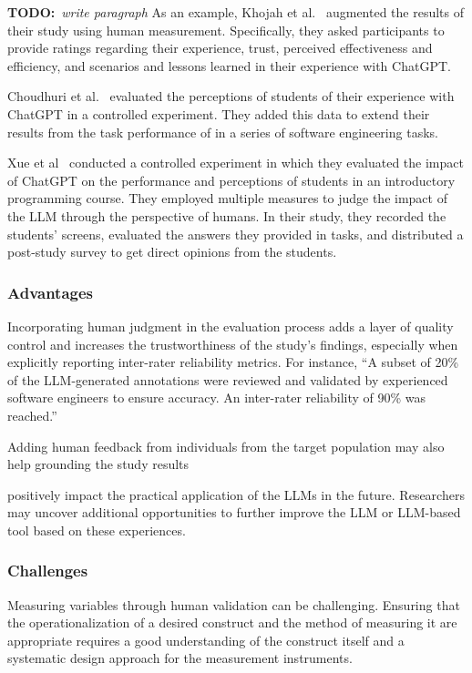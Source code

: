 \documentclass[11pt]{article}
\newcommand{\todo}[1]{{\textbf{TODO:}\ \textit{#1}}} %
\begin{document}
\todo{write paragraph}
As an example, Khojah et al.~\cite{DBLP:journals/pacmse/KhojahM0N24} augmented the results of their study using human measurement.
Specifically, they asked participants to provide ratings regarding their experience, trust, perceived effectiveness and efficiency, and scenarios and lessons learned in their experience with ChatGPT.

Choudhuri et al.~\cite{DBLP:conf/icse/ChoudhuriLSGS24} evaluated the perceptions of students of their experience with ChatGPT in a controlled experiment.
They added this data to extend their results from the task performance of in a series of software engineering tasks.

Xue et al~\cite{DBLP:conf/icse/XueCBTH24} conducted a controlled experiment in which they evaluated the impact of ChatGPT on the performance and perceptions of students in an introductory programming course.
They employed multiple measures to judge the impact of the LLM through the perspective of humans.
In their study, they recorded the students' screens, evaluated the answers they provided in tasks, and distributed a post-study survey to get direct opinions from the students.


\subsubsection{Advantages}

Incorporating human judgment in the evaluation process adds a layer of quality control and increases the trustworthiness of the study’s findings, especially when explicitly reporting inter-rater reliability metrics. For instance, ``A subset of 20\% of the LLM-generated annotations were reviewed and validated by experienced software engineers to ensure accuracy. An inter-rater reliability of 90\% was reached.''

Adding human feedback from individuals from the target population may also help grounding the study results 

positively impact the practical application of the LLMs in the future.
Researchers may uncover additional opportunities to further improve the LLM or LLM-based tool based on these experiences.

\subsubsection{Challenges}

Measuring variables through human validation can be challenging.
Ensuring that the operationalization of a desired construct and the method of measuring it are appropriate requires a good understanding of the construct itself and a systematic design approach for the measurement instruments.
\end{document}
